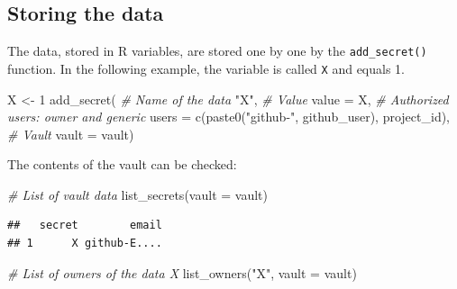 \documentclass[
  12pt,
  american,
  a4paper,
  extrafontsizes,onecolumn,openright
  ]{memoir}
\newenvironment{Shaded}{\begin{snugshade}}{\end{snugshade}}
\newcommand{\AttributeTok}[1]{\textcolor[rgb]{0.77,0.63,0.00}{#1}}
\newcommand{\CommentTok}[1]{\textcolor[rgb]{0.56,0.35,0.01}{\textit{#1}}}
\newcommand{\DecValTok}[1]{\textcolor[rgb]{0.00,0.00,0.81}{#1}}
\newcommand{\FunctionTok}[1]{\textcolor[rgb]{0.00,0.00,0.00}{#1}}
\newcommand{\NormalTok}[1]{#1}
\newcommand{\OtherTok}[1]{\textcolor[rgb]{0.56,0.35,0.01}{#1}}
\newcommand{\StringTok}[1]{\textcolor[rgb]{0.31,0.60,0.02}{#1}}
\begin{document}
\normalsize

\hypertarget{storing-the-data}{%
\subsection{Storing the data}\label{storing-the-data}}

The data, stored in R variables, are stored one by one by the \texttt{add\_secret()} function.
In the following example, the variable is called \texttt{X} and equals 1.

\scriptsize

\begin{Shaded}
\begin{Highlighting}[]
\NormalTok{X }\OtherTok{\textless{}{-}} \DecValTok{1}
\FunctionTok{add\_secret}\NormalTok{(}
  \CommentTok{\# Name of the data}
  \StringTok{"X"}\NormalTok{, }
  \CommentTok{\# Value}
  \AttributeTok{value =}\NormalTok{ X, }
  \CommentTok{\# Authorized users: owner and generic}
  \AttributeTok{users =} \FunctionTok{c}\NormalTok{(}\FunctionTok{paste0}\NormalTok{(}\StringTok{"github{-}"}\NormalTok{, github\_user), project\_id), }
  \CommentTok{\# Vault}
  \AttributeTok{vault =}\NormalTok{ vault)}
\end{Highlighting}
\end{Shaded}

\normalsize

The contents of the vault can be checked:

\scriptsize

\begin{Shaded}
\begin{Highlighting}[]
\CommentTok{\# List of vault data}
\FunctionTok{list\_secrets}\NormalTok{(}\AttributeTok{vault =}\NormalTok{ vault)}
\end{Highlighting}
\end{Shaded}

\begin{verbatim}
##   secret        email
## 1      X github-E....
\end{verbatim}

\begin{Shaded}
\begin{Highlighting}[]
\CommentTok{\# List of owners of the data \textquotesingle{}X}
\FunctionTok{list\_owners}\NormalTok{(}\StringTok{"X"}\NormalTok{, }\AttributeTok{vault =}\NormalTok{ vault)}
\end{Highlighting}
\end{Shaded}
\end{document}
